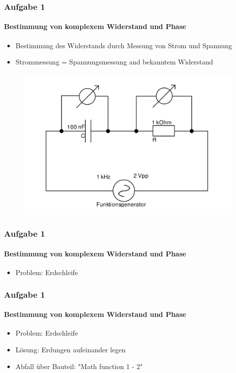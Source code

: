 \begin{frame}
\frametitle{Aufgabe 1}
\framesubtitle{Bestimmung von komplexem Widerstand und Phase}
    \begin{itemize}
        \item Bestimmung des Widerstands durch Messung von Strom und Spannung
        \item Strommessung = Spannungsmessung and bekanntem Widerstand
    \end{itemize}    
    \begin{figure}[H]
    \begin{center}
            \includegraphics[scale=0.15]{./img/schaltbild_1_ohne_erdung.png}
    \end{center}
    \end{figure}
\end{frame}
\begin{frame}
\frametitle{Aufgabe 1}
\framesubtitle{Bestimmung von komplexem Widerstand und Phase}
    \begin{itemize}
        \item Problem: Erdschleife
    \end{itemize}
\end{frame}
\begin{frame}
\frametitle{Aufgabe 1}
\framesubtitle{Bestimmung von komplexem Widerstand und Phase}
    \begin{itemize}
        \item Problem: Erdschleife
        \item Lösung: Erdungen aufeinander legen
        \item Abfall über Bauteil: "Math function 1 - 2"
    \end{itemize}
\end{frame}

